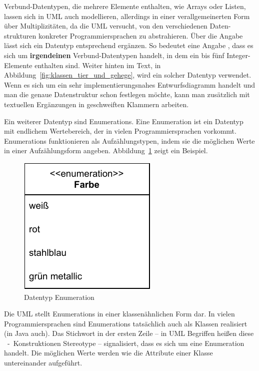 Verbund-Datentypen, die mehrere Elemente enthalten, wie Arrays oder Listen, 
\linebreak %
lassen sich in UML auch modellieren, allerdings in einer verallgemeinerten Form 
\linebreak %
über Multiplizitäten, da die UML versucht, von den verschiedenen Daten-
\linebreak %
strukturen konkreter Programmiersprachen zu abstrahieren. Über die Angabe 
\linebreak %
 lässt sich ein Datentyp entsprechend ergänzen. So bedeutet eine Angabe , dass es sich um \textbf{irgendeinen} Verbund-Datentypen handelt, in dem ein bis fünf Integer-Elemente enthalten sind. Weiter hinten im Text, in Abbildung~\ref{fig:klassen_tier_und_gehege}, wird ein solcher Datentyp verwendet. Wenn es sich um ein sehr implementierungsnahes Entwurfsdiagramm handelt und man die genaue Datenstruktur schon festlegen möchte, kann man zusätzlich mit textuellen Ergänzungen in geschweiften Klammern arbeiten. 

Ein weiterer Datentyp sind Enumerations. Eine Enumeration ist ein Datentyp mit endlichem Wertebereich, der in vielen Programmiersprachen vorkommt. Enumerations funktionieren als Aufzählungstypen, indem sie die möglichen Werte in einer Aufzählungsform angeben. Abbildung~\ref{fig:enumeration_farbe} zeigt ein Beispiel. 

\begin{figure}[h!]
	\centering
	\includegraphics[scale=1.0]{Bilder/Kapitel-8/enumeration_farbe.pdf}
	\caption{Datentyp Enumeration}
	\label{fig:enumeration_farbe}
\end{figure}

\pagebreak %

Die UML stellt Enumerations in einer klassenähnlichen Form dar. In vielen Programmiersprachen sind Enumerations tatsächlich auch als Klassen realisiert (in \mbox{Java} auch). Das Stichwort  in der ersten Zeile -- in UML Begriffen heißen diese ~-~Konstruktionen Stereotype -- signalisiert, dass es sich um eine Enumeration handelt. Die möglichen Werte werden wie die Attribute einer Klasse untereinander aufgeführt. 

